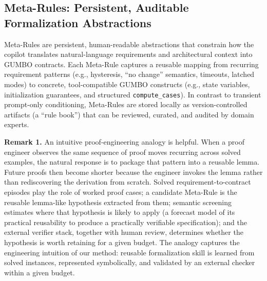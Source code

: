 \documentclass[conference]{IEEEtran}
\begin{document}

\subsection{Meta-Rules: Persistent, Auditable Formalization Abstractions}
Meta-Rules are persistent, human-readable abstractions that constrain how the copilot translates natural-language requirements and architectural context into GUMBO contracts. Each Meta-Rule captures a reusable mapping from recurring requirement patterns (e.g., hysteresis, ``no change'' semantics, timeouts, latched modes) to concrete, tool-compatible GUMBO constructs (e.g., state variables, initialization guarantees, and structured \texttt{compute\_cases}). In contrast to transient prompt-only conditioning, Meta-Rules are stored locally as version-controlled artifacts (a ``rule book'') that can be reviewed, curated, and audited by domain experts. 

\textbf{Remark 1.} An intuitive proof-engineering analogy is helpful. When a proof engineer observes the same sequence of proof moves recurring across solved examples, the natural response is to package that pattern into a reusable lemma. Future proofs then become shorter because the engineer invokes the lemma rather than rediscovering the derivation from scratch.
Solved requirement-to-contract episodes play the role of worked proof cases; a candidate Meta-Rule is the reusable lemma-like hypothesis extracted from them; semantic screening estimates where that hypothesis is likely to apply (a forecast model of its practical reusability to produce a practically verifiable specification); and the external verifier stack, together with human review, determines whether the hypothesis is worth retaining for a given budget. The analogy captures the engineering intuition of our method: reusable formalization skill is learned from solved instances, represented symbolically, and validated by an external checker within a given budget.
\end{document}
